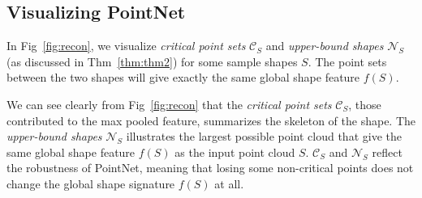 \subsection{Visualizing PointNet}
\label{sec:visualizing_pointnet}

In Fig~\ref{fig:recon}, we visualize \textit{critical point sets} $\mathcal{C}_S$ and \textit{upper-bound shapes} $\mathcal{N}_S$ (as discussed in Thm~\ref{thm:thm2}) for some sample shapes $S$. The point sets between the two shapes will give exactly the same global shape feature $f(S)$. 

We can see clearly from Fig~\ref{fig:recon} that the \textit{critical point sets} $\mathcal{C}_S$, those contributed to the max pooled feature, summarizes the skeleton of the shape.
The \textit{upper-bound shapes} $\mathcal{N}_S$ illustrates the largest possible point cloud that give the same global shape feature $f(S)$ as the input point cloud $S$. $\mathcal{C}_S$ and $\mathcal{N}_S$ reflect the robustness of PointNet, meaning that losing some non-critical points does not change the global shape signature $f(S)$ at all.



